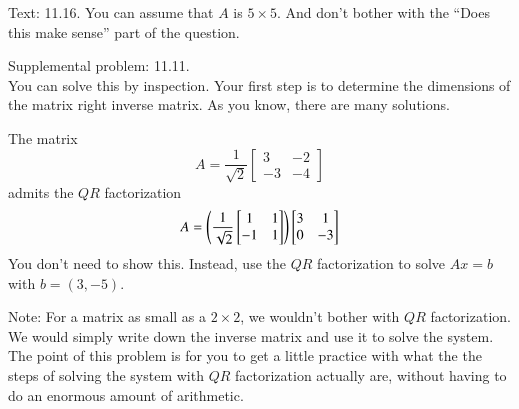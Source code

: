 \documentclass[minion]{homework}
\begin{document}
\begin{problems}

    \problem Text: 11.16. You can assume that $A$ is $5\times 5$. And don't bother with the ``Does this make sense'' part of the question.

    \problem Supplemental problem: 11.11. \\
    You can solve this by inspection. Your first step is to determine the dimensions of the matrix right inverse matrix. As you know, there are many solutions.


    \problem The matrix 
    \[
    A  =\frac{1}{\sqrt{2}}\begin{bmatrix} 3 & -2 \\ -3 & -4 \end{bmatrix}
    \]
    admits the $QR$ factorization
    \[
    A =   \left(\frac{1}{\sqrt{2}}\begin{bmatrix} 1 & 1 \\ -1 & 1 \end{bmatrix}\right)
    \begin{bmatrix} 3 & 1 \cr 0 & -3\end{bmatrix}
    \]
    You don't need to show this.  Instead, use the $QR$ factorization
    to solve $Ax=b$ with $b=(3,-5)$.  

    Note: For a matrix as small as a $2\times 2$, we wouldn't bother with
    $QR$ factorization. We would simply write down
    the inverse matrix and use it to solve the system.  
    The point of this problem is for you to get a little practice with
    what the the steps of solving the system with $QR$ factorization actually are,
    without having to do an enormous amount of arithmetic.
\end{problems}
\end{document}
